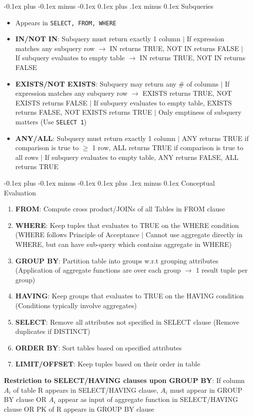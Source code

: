 \documentclass[landscape]{article}
\makeatletter
\renewcommand{\subsection}{\@startsection{subsection}{2}{0mm}%
  {-0.1ex plus -0.1ex minus -0.1ex}%
  {0.1ex plus .1ex minus 0.1ex}%
{\normalfont\scriptsize\bfseries}}
\makeatother
\begin{document}
\begin{multicols*}{5}
    \subsection{Subqueries}
    \begin{itemize}
      \item Appears in \verb|SELECT, FROM, WHERE|
      \item \textbf{IN/NOT IN}: Subquery must return exactly 1 column $\vert$ If expression matches any subquery row $\rightarrow$ IN returns TRUE, NOT IN returns FALSE $\vert$ If subquery evaluates to empty table $\rightarrow$ IN returns TRUE, NOT IN returns FALSE
      \item \textbf{EXISTS/NOT EXISTS}: Subquery may return any \# of columns $\vert$ If expression matches any subquery row $\rightarrow$ EXISTS returns TRUE, NOT EXISTS returns FALSE $\vert$ If subquery evaluates to empty table, EXISTS returns FALSE, NOT EXISTS returns TRUE $\vert$ Only emptiness of subquery matters (Use \verb|SELECT 1|)
      \item \textbf{ANY/ALL}: Subquery must return exactly 1 column $\vert$ ANY returns TRUE if comparison is true to $\geq$ 1 row, ALL returns TRUE if comparison is true to all rows  $\vert$ If subquery evaluates to empty table, ANY returns FALSE, ALL returns TRUE
    \end{itemize}

    \subsection{Conceptual Evaluation}
    \begin{enumerate}
      \item \textbf{FROM}: Compute cross product/JOINs of all Tables in FROM clause
      \item \textbf{WHERE}: Keep tuples that evaluates to TRUE on the WHERE condition (WHERE follows Principle of Acceptance $\vert$ Cannot use aggregate directly in WHERE, but can have sub-query which contains aggregate in WHERE)
      \item \textbf{GROUP BY}: Partition table into groups w.r.t grouping attributes (Application of aggregate functions are over each group $\rightarrow$ 1 result tuple per group)
      \item \textbf{HAVING}: Keep groups that evaluates to TRUE on the HAVING condition (Conditions typically involve aggregates)
      \item \textbf{SELECT}: Remove all attributes not specified in SELECT clause (Remove duplicates if DISTINCT)
      \item \textbf{ORDER BY}: Sort tables based on specified attributes
      \item \textbf{LIMIT/OFFSET}: Keep tuples based on their order in table
    \end{enumerate}
    \textbf{Restriction to SELECT/HAVING clauses upon GROUP BY}: If column $A_i$ of table R appears in SELECT/HAVING clause, $A_i$ must appear in GROUP BY clause OR $A_i$ appear as input of aggregate function in SELECT/HAVING clause OR PK of R appears in GROUP BY clause


\end{multicols*}
\end{document}
